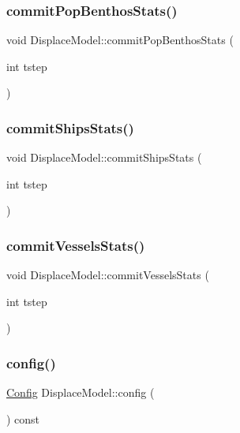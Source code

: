 \subsubsection{\texorpdfstring{commitPopBenthosStats()}{commitPopBenthosStats()}}
{\footnotesize\ttfamily void Displace\+Model\+::commit\+Pop\+Benthos\+Stats (\begin{DoxyParamCaption}\item[{int}]{tstep }\end{DoxyParamCaption})}

\mbox{\label{class_displace_model_aea6235feffd39564437d218431d9ad0c}} 
\subsubsection{\texorpdfstring{commitShipsStats()}{commitShipsStats()}}
{\footnotesize\ttfamily void Displace\+Model\+::commit\+Ships\+Stats (\begin{DoxyParamCaption}\item[{int}]{tstep }\end{DoxyParamCaption})}

\mbox{\label{class_displace_model_a9b9b0491354b8a21ec457039c2098118}} 
\subsubsection{\texorpdfstring{commitVesselsStats()}{commitVesselsStats()}}
{\footnotesize\ttfamily void Displace\+Model\+::commit\+Vessels\+Stats (\begin{DoxyParamCaption}\item[{int}]{tstep }\end{DoxyParamCaption})}

\mbox{\label{class_displace_model_ac7848be5f0ed85cdfd8eace56bbcb30f}} 
\subsubsection{\texorpdfstring{config()}{config()}}
{\footnotesize\ttfamily \mbox{\hyperlink{class_config}{Config}} Displace\+Model\+::config (\begin{DoxyParamCaption}{ }\end{DoxyParamCaption}) const}

